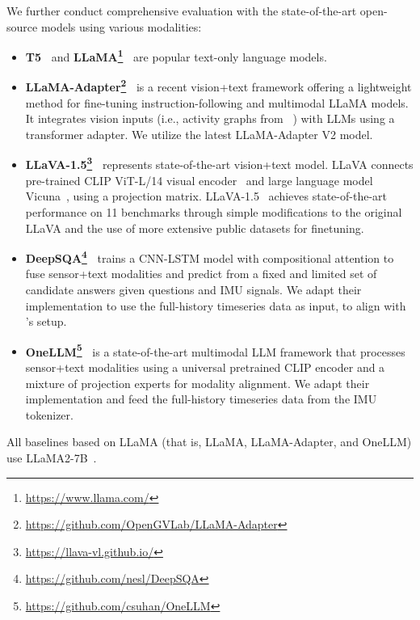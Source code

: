 We further conduct comprehensive evaluation with the state-of-the-art open-source models using various modalities:
\begin{itemize}[topsep=0pt, itemsep=0pt]
    \item \textbf{T5~\cite{2020t5}} and \textbf{LLaMA\footnote{\url{https://www.llama.com/}}~\cite{touvron2023llama}} are popular \textcolor{mygreen}{text-only} language models.
    
    \item \textbf{LLaMA-Adapter\footnote{\url{https://github.com/OpenGVLab/LLaMA-Adapter}}~\cite{zhang2023llama}} is a recent \textcolor{myred}{vision+text} framework offering a lightweight method for fine-tuning instruction-following and multimodal LLaMA models. It integrates vision inputs (i.e., activity graphs from \Dataset~\citesensorqa) with LLMs using a transformer adapter. We utilize the latest LLaMA-Adapter V2 model.
    
    \item \textbf{LLaVA-1.5\footnote{\url{https://llava-vl.github.io/}}~\cite{liu2024improved}} represents state-of-the-art \textcolor{myred}{vision+text} model. LLaVA connects pre-trained CLIP ViT-L/14 visual encoder~\cite{radford2021learning} and large language model Vicuna~\cite{vicuna2023}, using a projection matrix. LLaVA-1.5~\cite{liu2024improved} achieves state-of-the-art performance on 11 benchmarks through simple modifications to the original LLaVA and the use of more extensive public datasets for finetuning.
    
    \item \textbf{DeepSQA\footnote{\url{https://github.com/nesl/DeepSQA}}~\cite{xing2021deepsqa}} trains a CNN-LSTM model with compositional attention to fuse \textcolor{myblue}{sensor+text} modalities and predict from a fixed and limited set of candidate answers given questions and IMU signals. We adapt their implementation to use the full-history timeseries data as input, to align with \Method's setup.
    
    \item \textbf{OneLLM\footnote{\url{https://github.com/csuhan/OneLLM}}~\cite{han2023onellm}} is a state-of-the-art multimodal LLM framework that processes \textcolor{myblue}{sensor+text} modalities using a universal pretrained CLIP encoder and a mixture of projection experts for modality alignment. We adapt their implementation and feed the full-history timeseries data from the IMU tokenizer.
\end{itemize}
All baselines based on LLaMA (that is, LLaMA, LLaMA-Adapter, and OneLLM) use LLaMA2-7B~\cite{touvron2023llama}.
